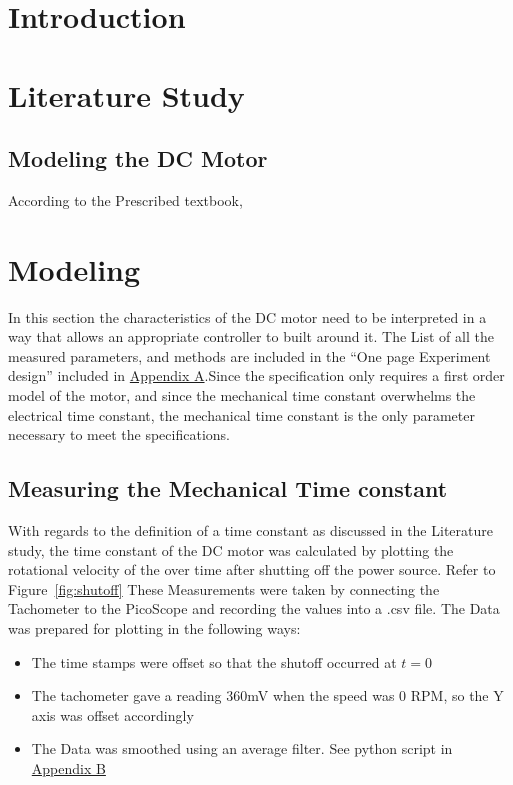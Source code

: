 
\chapter{Introduction}







\chapter{Literature Study}
\section{Modeling the DC Motor}
According to the Prescribed textbook\cite[p.160]{dorf2011modern}, 




\chapter{Modeling}
In this section the characteristics of the DC motor need to be interpreted in a way that allows an appropriate controller to built around it. The List of all the measured parameters, and methods are included in the ``One page Experiment design'' included in \hyperref[apx:A]{Appendix A}.Since the specification only requires a first order model of the motor, and since the mechanical time constant overwhelms the electrical time constant, the mechanical time constant is the only parameter necessary to meet the specifications.
\section{Measuring the Mechanical Time constant}
With regards to the definition of a time constant as discussed in the Literature study, the time constant of the DC motor was calculated by plotting the rotational velocity of the over time after shutting off the power source. Refer to Figure~\ref{fig:shutoff}
These Measurements were taken by connecting the Tachometer to the PicoScope and recording the values into a .csv file. The Data was prepared for plotting in the following ways:
\begin{itemize}
	\item The time stamps were offset so that the shutoff occurred at $t=0$ 
	\item The tachometer gave a reading 360mV when the speed was 0 RPM, so the Y axis was offset accordingly
	\item The Data was smoothed using an average filter. See python script in \hyperref[apx:B]{Appendix B}
\end{itemize}

